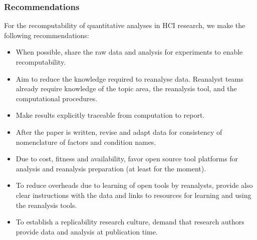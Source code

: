 \subsubsection{Recommendations}
For the recomputability of quantitative analyses in HCI research, we make the following recommendations:
\begin{itemize}
\item When possible, share the raw data and analysis for experiments to enable recomputability.
\item Aim to reduce the knowledge required to reanalyse data. Reanalyst teams already require knowledge of the topic area, the reanalysis tool, and the computational procedures.
\item Make results explicitly traceable from computation to report.
\item After the paper is written, revise and adapt data for consistency of nomenclature of factors and condition names.
\item Due to cost, fitness and availability, favor open source tool platforms for analysis and reanalysis preparation (at least for the moment).
\item To reduce overheads due to learning of open tools by reanalysts, provide also clear instructions with the data and links to resources for learning and using the reanalysis tools.
\item To establish a replicability research culture, demand that research authors provide data and analysis at publication time.
\end{itemize}
